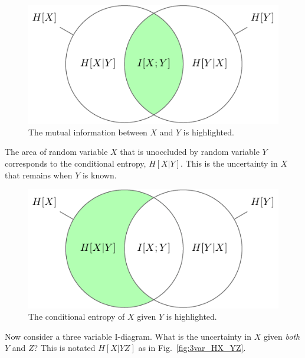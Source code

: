 \begin{figure}[h]
\centering
\includegraphics{../appendix2/figures/tikz/2var/2var_IXY}
\caption{The mutual information between $X$ and $Y$ is highlighted.}
\label{fig:2var_IXY}
\end{figure}

The area of random variable $X$ that is unoccluded by random variable $Y$ corresponds to the conditional entropy, $H[X|Y]$. This is the uncertainty in $X$ that remains when $Y$ is known.

\begin{figure}[h]
\centering
\includegraphics{../appendix2/figures/tikz/2var/2var_HX_Y}
\caption{The conditional entropy of $X$ given $Y$ is highlighted.}
\label{fig:2var_HX_Y}
\end{figure}

Now consider a three variable I-diagram. What is the uncertainty in $X$ given \emph{both} $Y$ and $Z$? This is notated $H[X|YZ]$ as in Fig.~\ref{fig:3var_HX_YZ}.

